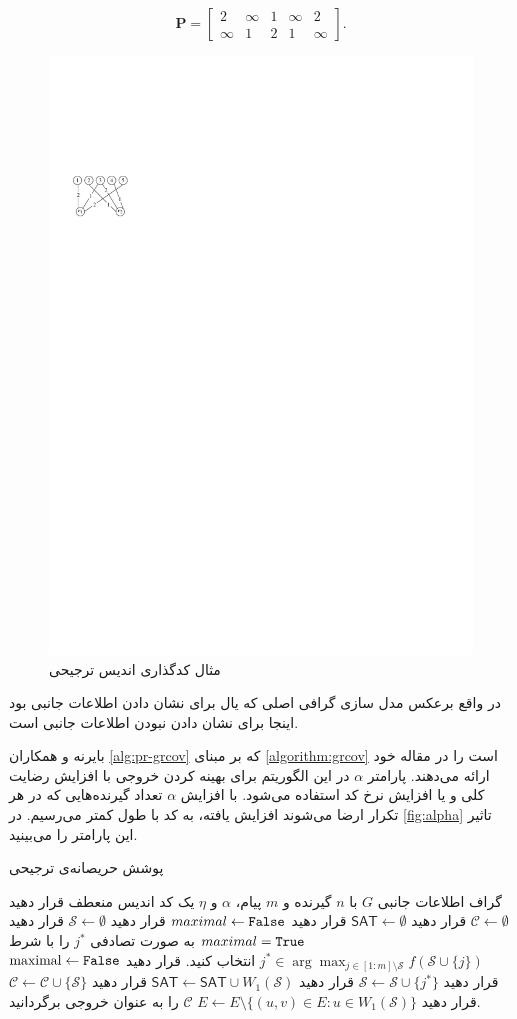 \begin{example}
\begin{equation*}
	\boldsymbol{P} = 
	\begin{bmatrix}
		2 & \infty & 1 &\infty & 2\\
		\infty & 1 & 2 & 1 & \infty \label{eq:ppicod-instance}
	\end{bmatrix}.
\end{equation*}
\begin{figure}[H]
	\centering
	\includegraphics[width=0.2\linewidth]{figs/chapter4/ppgraph.pdf}
	\caption[
	مثال کدگذاری اندیس ترجیحی
	]{
		مثال کدگذاری اندیس ترجیحی
		\cite{byrne2023preferential}
		}
	\label{fig:ppgraph}
\end{figure}
در واقع برعکس مدل سازی گرافی اصلی که یال برای نشان دادن اطلاعات جانبی بود اینجا برای نشان دادن نبودن اطلاعات جانبی است.
\end{example}
بایرنه و همکاران
\autoref{alg:pr-grcov}
 که بر مبنای 
 \autoref{algorithm:grcov}
  است را در مقاله خود ارائه می‌دهند. پارامتر 
 $\alpha$
 در این الگوریتم برای بهینه کردن خروجی با افزایش رضایت کلی و یا افزایش نرخ کد استفاده می‌‌شود. با افزایش 
 $\alpha$
 تعداد گیرنده‌هایی که در هر تکرار ارضا می‌شوند افزایش یافته، به کد با طول کمتر می‌رسیم. در 
 \autoref{fig:alpha}
 تاثیر این پارامتر را می‌بینید.
\begin{algorithm}
	\caption[
		پوشش حریضانه‌ی ترجیحی
	]{
		پوشش حریصانه‌ی ترجیحی
	}
	\label{alg:pr-grcov}
	\begin{algorithmic}[1]
		\Require
			گراف اطلاعات جانبی
		$G$
		با
		$n$
		گیرنده و
		$m$
		پیام،
		$\alpha$
		و
		$\eta$
		\Ensure
		یک کد  اندیس منعطف
		\State قرار دهید
		$\mathcal{C} \gets \emptyset$
		\State قرار دهید
		$\mathsf{SAT} \gets \emptyset$ 
		\State قرار دهید
		$maximal \gets \texttt{False}$
		\State قرار دهید
		$\mathcal{S} \gets \emptyset$
		\State قرار دهید
		$maximal = \texttt{True}$
		\State
		به صورت تصادفی
		$j^{\ast}$
		را با شرط
		$j^* \in \arg \max_{j \in [1:m] \setminus \mathcal{S}} f(\mathcal{S} \cup \{j\})$
		انتخاب کنید.
		\State قرار دهید
		$\textrm{maximal} \gets \texttt{False}$
		\State قرار دهید
		$\mathcal{S} \gets \mathcal{S} \cup \{j^*\}$
		\EndIf
		\EndWhile
		\State قرار دهید
		 $\mathsf{SAT} \gets \mathsf{SAT} \cup W_1(\mathcal{S})$
		\State قرار دهید
		$\mathcal{C} \gets \mathcal{C} \cup \{\mathcal{S}\}$
		\State قرار دهید
		$E \gets E \setminus \{ (u,v) \in E: u \in W_1(\mathcal{S})\}$
		\EndWhile
		\State $\mathcal{C}$
		را به عنوان خروجی برگردانید.
	\end{algorithmic}
\end{algorithm}

